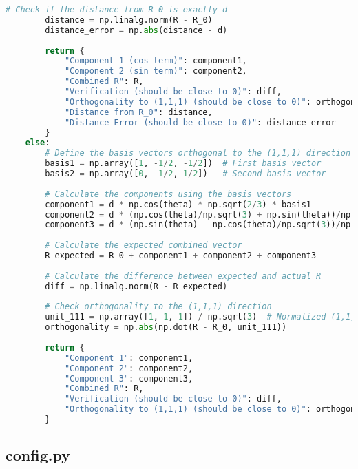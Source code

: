 \begin{lstlisting}[language=Python]
        # Check if the distance from R_0 is exactly d
        distance = np.linalg.norm(R - R_0)
        distance_error = np.abs(distance - d)
        
        return {
            "Component 1 (cos term)": component1,
            "Component 2 (sin term)": component2,
            "Combined R": R,
            "Verification (should be close to 0)": diff,
            "Orthogonality to (1,1,1) (should be close to 0)": orthogonality,
            "Distance from R_0": distance,
            "Distance Error (should be close to 0)": distance_error
        }
    else:
        # Define the basis vectors orthogonal to the (1,1,1) direction
        basis1 = np.array([1, -1/2, -1/2])  # First basis vector
        basis2 = np.array([0, -1/2, 1/2])   # Second basis vector
        
        # Calculate the components using the basis vectors
        component1 = d * np.cos(theta) * np.sqrt(2/3) * basis1
        component2 = d * (np.cos(theta)/np.sqrt(3) + np.sin(theta))/np.sqrt(2) * basis1
        component3 = d * (np.sin(theta) - np.cos(theta)/np.sqrt(3))/np.sqrt(2) * basis2 * np.sqrt(2)
        
        # Calculate the expected combined vector
        R_expected = R_0 + component1 + component2 + component3
        
        # Calculate the difference between expected and actual R
        diff = np.linalg.norm(R - R_expected)
        
        # Check orthogonality to the (1,1,1) direction
        unit_111 = np.array([1, 1, 1]) / np.sqrt(3)  # Normalized (1,1,1) vector
        orthogonality = np.abs(np.dot(R - R_0, unit_111))
        
        return {
            "Component 1": component1,
            "Component 2": component2,
            "Component 3": component3,
            "Combined R": R,
            "Verification (should be close to 0)": diff,
            "Orthogonality to (1,1,1) (should be close to 0)": orthogonality
        }
\end{lstlisting}

\subsection{config.py}

